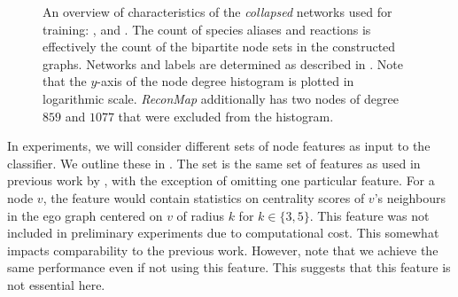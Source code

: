 \documentclass[
	fontsize=10pt, %
	twoside=true, %
	secnumdepth=1, %
  toc=indentunnumbered %
]{kaobook}
\begin{document}
\begin{figure}[h]
\begin{subfigure}{0.32\textwidth}
  \end{subfigure} 
  \caption[ An overview of characteristics of networks used for training. ]{ An
    overview of characteristics of the \textit{collapsed} networks used for
    training: \ADLast{}, \PDMap{} and \ReconMap{}. The count of species aliases
    and reactions is effectively the count of the bipartite node sets in the
    constructed graphs.
    Networks and labels are
    determined as described in . Note that the $y$-axis of the
    node degree histogram is plotted in logarithmic scale. \textit{ReconMap}
    additionally has two nodes of degree $859$ and $1077$ that were excluded
    from the histogram. }
  \label{fig:maps-summary}
\end{figure}




In experiments, we will consider different sets of node features as input to the
classifier. We outline these  in 
. The set  is the same set of
features as used in previous work by \nielsen{}, with the exception of omitting one particular
feature. For a node $v$, the feature would contain statistics on centrality
scores of $v$'s neighbours in the ego graph centered on $v$ of radius $k$ for $k
\in \{3,5\}$. This feature was not included in preliminary experiments due to
computational cost. This somewhat impacts comparability to the previous work.
However, note that we achieve the same performance even if not using this
feature. This suggests that this feature is not essential here.
\end{document}
